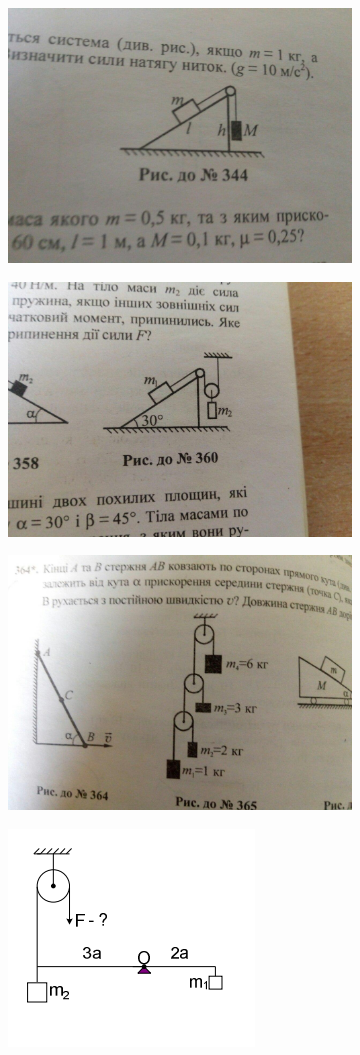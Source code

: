 \begin{problem}{1}
\begin{figure}[h!]
\begin{subfigure}{.4\textwidth}
			\caption{}
			\label{fig:gon343}
		\end{subfigure}
		\begin{subfigure}{.4\textwidth}
			\centering
			\includegraphics[width=0.5\linewidth]{class7/gon_344}
			\caption{}
			\label{fig:gon344}
		\end{subfigure}
		\begin{subfigure}{.4\textwidth}
			\centering
			\includegraphics[width=0.5\linewidth]{class7/gon_360}
			\caption{}
			\label{fig:gon360}
		\end{subfigure}
		\begin{subfigure}{.4\textwidth}
			\centering
			\includegraphics[width=0.5\linewidth]{class7/gon_365}
			\caption{}
			\label{fig:gon365}
		\end{subfigure}
		\begin{subfigure}{.4\textwidth}
			\centering
			\includegraphics[width=0.5\linewidth]{class7/lev_379}
			\caption{}
			\label{fig:lev379}
		\end{subfigure}
	\caption{}
	\end{figure}
	

\end{problem}
